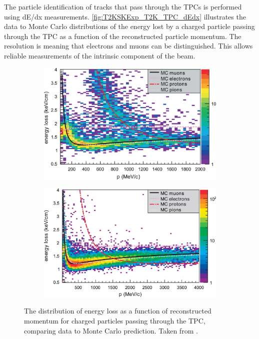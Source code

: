 The particle identification of tracks that pass through the TPCs is performed using dE/dx measurements. \autoref{fig:T2KSKExp_T2K_TPC_dEdx} illustrates the data to Monte Carlo distributions of the energy lost by a charged particle passing through the TPC as a function of the reconstructed particle momentum. The resolution is  meaning that electrons and muons can be distinguished. This allows reliable measurements of the intrinsic  component of the beam.

\begin{figure}[h]
  \begin{subfigure}[t]{0.48\textwidth}
    \includegraphics[width=\textwidth, trim={0mm 0mm 0mm 0mm}, clip,page=1]{Figures/Detectors/T2K_TPCdEdx_Positive.pdf}
  \end{subfigure}%
  \begin{subfigure}[t]{0.48\textwidth}
    \includegraphics[width=\textwidth, trim={0mm 0mm 0mm 0mm}, clip,page=1]{Figures/Detectors/T2K_TPCdEdx_Negative.pdf}
  \end{subfigure}
  \caption{The distribution of energy loss as a function of reconstructed momentum for charged particles passing through the TPC, comparing data to Monte Carlo prediction. Taken from \cite{Abgrall2011}.}
  \label{fig:T2KSKExp_T2K_TPC_dEdx}
\end{figure}

